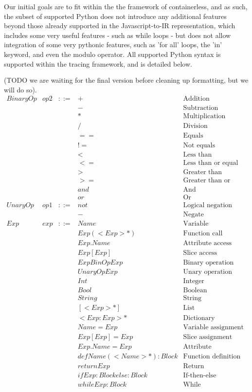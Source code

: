 \documentclass[acmsmall,review,authorversion]{acmart}
\begin{document}
Our initial goals are to fit within the the framework of containerless, and as such, the subset of supported Python does not introduce any additional features beyond those already supported in the Javascript-to-IR representation, which includes some very useful features - such as while loops - but does not allow integration of some very pythonic features, such as 'for all' loops, the 'in' keyword, and even the modulo operator. All supported Python syntax is supported within the tracing framework, and is detailed below.

(TODO we are waiting for the final version before cleaning up formatting, but we will do so).
\[\begin{array}{lrcll}
BinaryOp & op2 & ::= & + & \text{Addition}
\\
&&& - & \text{Subtraction}
\\
&&& * & \text{Multiplication}
\\
&&& / & \text{Division}
\\
&&& == & \text{Equals}
\\
&&& != & \text{Not equals}
\\
&&& < & \text{Less than}
\\
&&& <= & \text{Less than or equal to}
\\
&&& > & \text{Greater than}
\\
&&& >= & \text{Greater than or equal to}
\\
&&& and & \text{And}
\\
&&& or & \text{Or}
\\
UnaryOp & op1 & ::= & not & \text{Logical negation}
\\ 
&&& - & \text{Negate}
\\
Exp & exp & ::= & Name & \text{Variable}
\\
&&& Exp(<Exp>*) & \text{Function call}
\\
&&& Exp.Name & \text{Attribute access}
\\
&&& Exp[Exp] & \text{Slice access}
\\
&&& Exp BinOp Exp & \text{Binary operation}
\\
&&& UnaryOp Exp & \text{Unary operation}
\\
&&& Int & \text{Integer}
\\
&&& Bool & \text{Boolean}
\\
&&& String & \text{String}
\\
&&& [<Exp>*] & \text{List}
\\
&&& {<Exp:Exp>*} & \text{Dictionary}
\\
&&& Name = Exp & \text{Variable assignment}
\\
&&& Exp[Exp] = Exp & \text{Slice assignment}
\\
&&& Exp.Name = Exp & \text{Attribute assignment}
\\
&&& def Name(<Name>*) : Block & \text{Function definition}
\\
&&& return Exp & \text{Return}
\\
&&& if Exp: Block else: Block & \text{If-then-else}
\\
&&& while Exp: Block & \text{While}
\\
\end{array}\]
\end{document}

